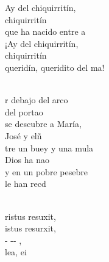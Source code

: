 \documentclass[12pt]{article}
\begin{document}
\begin{multicols*}{2}
\begin{cancion}[Chiquirritín][]%
	\begin{chorus}%
	Ay del chiquirritín,\\
chiquirritín\\
	que ha nacido entre a\\
¡Ay del chiquirritín, \\
chiquirritín\\
	queridín, queridito del ma!\\
	\end{chorus}%
	\jump\\
	r debajo del arco \\
	del portao\\
se descubre a María, \\
	José y elñ \\
	tre un buey y una mula\\
	Dios ha nao\\
y en un pobre pesebre \\
	le han recd\\
\end{cancion}%

\begin{cancion}%
	   \\
	ristus resuxit,\\
	istus resurxit,\\
	- -- , \\
	 lea, ei\\
\end{cancion}%


\end{multicols*}
\end{document}
